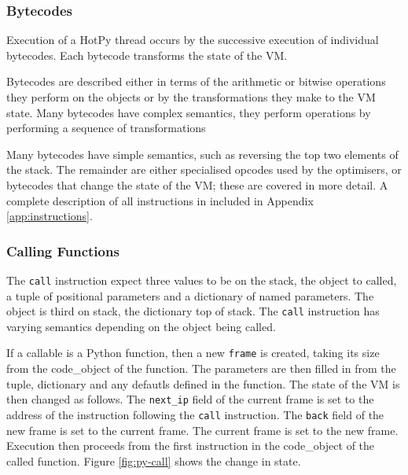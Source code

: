 \subsubsection{Bytecodes}

Execution of a HotPy thread occurs by the successive execution of individual bytecodes. Each bytecode transforms the state of the VM. 

Bytecodes are described either in terms of the arithmetic or bitwise operations they perform on the objects or by the transformations they make to the VM state. Many bytecodes have complex semantics, they perform operations by performing a sequence of transformations 

Many bytecodes have simple semantics, such as reversing the top two elements of the stack. The remainder are either specialised opcodes used by the optimisers, or bytecodes that change the state of the VM; these are covered in more detail. A complete description of all instructions in included in Appendix \ref{app:instructions}.

\subsubsection{Calling Functions}
The \verb|call| instruction expect three values to be on the stack, the object to called, a tuple of positional parameters and a dictionary of named parameters. The object is third on stack, the dictionary top of stack. 
The \verb|call| instruction has varying semantics depending on the object being called.

If a callable is a Python function, then a new \verb|frame| is created, taking its size from the code\_object of the function. The parameters are then filled in from the tuple, dictionary and any defautls defined in the function. The state of the VM is then changed as follows.
The \verb|next_ip| field of the current frame is set to the address of the instruction following the \verb|call| instruction. The \verb|back| field of the new frame is set to the current frame. The current frame is set to the new frame. Execution then proceeds from the first instruction in the code\_object of the called function. Figure \ref{fig:py-call} shows the change in state.

